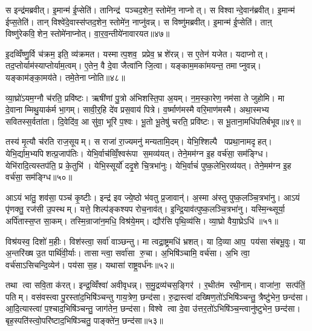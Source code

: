 स इन्द्र॑मब्रवीत्। इ॒मान्म॑ ई॒प्सेति॑। तानिन्द्र॑ पञ्चद॒शेन॒ स्तोमे॑न॒ नाप्नोत्। स विश्वान्दे॒वान॑ब्रवीत्। इ॒मान्म॑ ईप्स॒तेति॑। तान् विश्वे॑दे॒वास्स॑प्तद॒शेन॒ स्तोमे॑न॒ नाप्नु॑वन्न्। स विष्णु॑मब्रवीत्। इ॒मान्म॑ ई॒प्सेति॑। ताऩ् विष्णु॑रेकवि॒शेन॒ स्तोमे॑नाप्नोत्। वा॒र॒व॒न्तीये॑नावारयत॥४७॥

इ॒दव्विँष्णु॒र्वि च॑क्रम॒ इति॒ व्य॑क्रमत। यस्मात्प॒शव॒ प्रप्रेव॒ भ्रशे॑रन्न्। स ए॒तेन॑ यजेत। यदाप्नोत्। तद॒प्तोर्याम॑स्याप्तोर्याम॒त्वम्। ए॒तेन॒ वै दे॒वा जैत्वा॑नि जि॒त्वा। यङ्काम॒मका॑मयन्त॒ तमाप्नुवन्न्। यङ्काम॑ङ्का॒मय॑ते। तमे॒तेनाप्नोति॥४८॥\anuvakamend[स्तोमे॑न॒ नाप्नो॑दवारयत॒ नव॑ च]

व्या॒घ्रो॑ऽयम॒ग्नौ च॑रति॒ प्रवि॑ष्टः। ऋषी॑णां पु॒त्रो अ॑भिशस्ति॒पा अ॒यम्। न॒म॒स्का॒रेण॒ नम॑सा ते जुहोमि। मा दे॒वानाम्मिथु॒याक॑र्म भा॒गम्। सावी॒र्॒हि दे॑व प्रस॒वाय॑ पित्रे। व॒र्ष्माण॑मस्मै वरि॒माण॑मस्मै। अथा॒स्मभ्य सवितस्स॒र्वता॑ता। दि॒वेदि॑व॒ आ सु॑वा॒ भूरि॑ प॒श्वः। भू॒तो भू॒तेषु॑ चरति॒ प्रवि॑ष्टः। स भू॒ताना॒मधि॑पतिर्बभूव॥४९॥

तस्य॑ मृ॒त्यौ च॑रति राज॒सूयम्। स राजा॑ रा॒ज्यमनु॑ मन्यतामि॒दम्। येभि॒श्शिल्पै पप्रथा॒नामदृहत्। येभि॒र्द्याम॒भ्यपिशत्प्र॒जाप॑तिः। येभि॒र्वाच॑व्विँ॒श्वरू॑पा स॒मव्य॑यत्। तेने॒मम॑ग्न इ॒ह वर्च॑सा॒ सम॑ङ्ग्धि। येभि॑रादि॒त्यस्तप॑ति॒ प्र के॒तुभि॑। येभि॒स्सूर्यो॑ ददृ॒शे चि॒त्रभा॑नुः। येभि॒र्वाचं॑ पुष्क॒लेभि॒रव्य॑यत्। तेने॒मम॑ग्न इ॒ह वर्च॑सा॒ सम॑ङ्ग्धि॥५०॥

आऽयं भा॑तु॒ शव॑सा॒ पञ्च॑ कृ॒ष्टीः। इन्द्र॑ इव ज्ये॒ष्ठो भ॑वतु प्र॒जावान्॑। अ॒स्मा अ॑स्तु पुष्क॒लञ्चि॒त्रभा॑नु। आऽयं पृ॑णक्तु॒ रज॑सी उ॒पस्थम्। यत्ते॒ शिल्प॑ङ्कश्यप रोच॒नाव॑त्। इ॒न्द्रि॒याव॑त्पुष्क॒लञ्चि॒त्रभा॑नु। यस्मि॒न्थ्सूर्या॒ अर्पि॑तास्स॒प्त सा॒कम्। तस्मि॒न्राजा॑न॒मधि॒ विश्र॑ये॒मम्। द्यौर॑सि पृथि॒व्य॑सि। व्या॒घ्रो वैया॒घ्रेऽधि॑ ॥५१॥

विश्र॑यस्व॒ दिशो॑ म॒हीः। विश॑स्त्वा॒ सर्वा॑ वाञ्छन्तु। मा त्वद्रा॒ष्ट्रमधि॑ भ्रशत्। या दि॒व्या आप॒ पय॑सा संबभू॒वुः। या अ॒न्तरि॑ख्ष उ॒त पार्थि॑वी॒र्याः। तासान्त्वा॒ सर्वा॑सा रु॒चा। अ॒भिषि॑ञ्चामि॒ वर्च॑सा। अ॒भि त्वा॒ वर्च॑साऽसिचन्दि॒व्येन॑। पय॑सा स॒ह। यथासा॑ राष्ट्र॒वर्ध॑नः॥५२॥

तथा त्वा सवि॒ता क॑रत्। इन्द्र॒व्विँश्वा॑ अवीवृधन्न्। स॒मु॒द्रव्य॑चस॒ङ्गिर॑। र॒थीत॑म रथी॒नाम्। वाजा॑ना॒ सत्प॑तिं॒ पतिम्। वस॑वस्त्वा पु॒रस्ता॑द॒भिषि॑ञ्चन्तु गाय॒त्रेण॒ छन्द॑सा। रु॒द्रास्त्वा॑ दख्षिण॒तो॑ऽभिषि॑ञ्चन्तु॒ त्रैष्टु॑भेन॒ छन्द॑सा। आ॒दि॒त्यास्त्वा॑ प॒श्चाद॒भिषि॑ञ्चन्तु॒ जाग॑तेन॒ छन्द॑सा। विश्वे त्वा दे॒वा उ॑त्तर॒तो॑ऽभिषि॑ञ्च॒न्त्वानु॑ष्टुभेन॒ छन्द॑सा। बृह॒स्पति॑स्त्वो॒परि॑ष्टाद॒भिषि॑ञ्चतु॒ पाङ्क्ते॑न॒ छन्द॑सा॥५३॥


